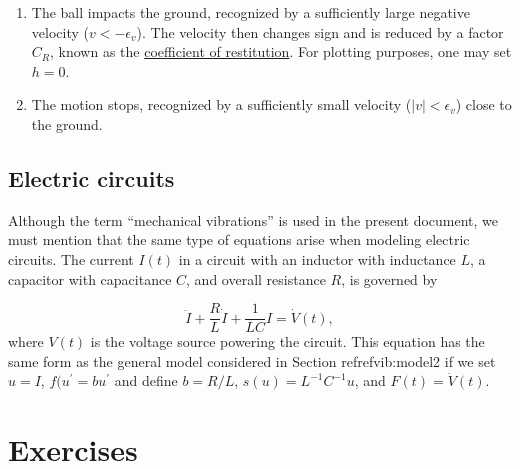 \documentclass[%
oneside,                 %
final,                   %
10pt]{article}
\begin{document}
\begin{enumerate}
\item The ball impacts the ground, recognized by a sufficiently large negative
   velocity ($v<-\epsilon_v$). The velocity then changes sign and is
   reduced by a factor $C_R$, known as the \href{{http://en.wikipedia.org/wiki/Coefficient_of_restitution}}{coefficient of restitution}.
   For plotting purposes, one may set $h=0$.

\item The motion stops, recognized by a sufficiently small velocity
   ($|v|<\epsilon_v$) close to the ground.
\end{enumerate}

\noindent
\subsection{Electric circuits}

Although the term ``mechanical vibrations'' is used in the present
document, we must mention that the same type of equations arise
when modeling electric circuits.
The current $I(t)$ in a
circuit with an inductor with inductance $L$, a capacitor with
capacitance $C$, and overall resistance $R$, is governed by

\begin{equation}
\ddot I + \frac{R}{L}\dot I + \frac{1}{LC}I = \dot V(t),
\end{equation}
where $V(t)$ is the voltage source powering the circuit.
This equation has the same form as the general model considered in
Section refref{vib:model2} if we set $u=I$, $f(u^{\prime}=bu^{\prime}$
and define $b=R/L$, $s(u) = L^{-1}C^{-1}u$, and $F(t)=\dot V(t)$.


\section{Exercises}
\end{document}
